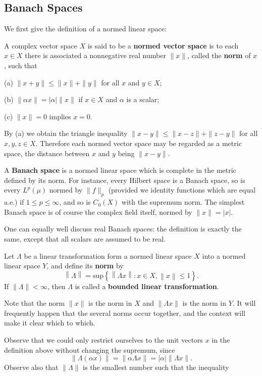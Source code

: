 \subsection{Banach Spaces}
We first give the definition of a normed linear space: 
\begin{definition}
A complex vector space $X$ is said to be a \textbf{normed vector space} is to each $x\in X$ there is associated a nonnegative real number $\|x\|$, called the \textbf{norm} of $x$, such that \par
(a) $\|x+y\|\le\|x\|+\|y\|$ for all $x$ and $y\in X$;\par
(b) $\|\alpha x\|=|\alpha|\|x\|$ if $x\in X$ and $\alpha$ is a scalar;\par
(c) $\|x\|=0$ implies $x=0$.
\end{definition}
By (a) we obtain the triangle inequality $\|x-y\|\le\|x-z\|+\|z-y\|$ for all $x,y,z\in X$. Therefore each normed vector space may be regarded as a metric space, the distance between $x$ and $y$ being $\|x-y\|$.\par
A \textbf{Banach space} is a normed linear space which is complete in the metric defined by its norm. For instance, every Hilbert space is a Banach space, so is every $L^p(\mu)$ normed by $\|f\|_p$ (provided we identity functions which are equal a.e.) if $1\le p\le\infty$, and so is $C_0(X)$ with the supremum norm. The simplest Banach space is of course the complex field itself, normed by $\|x\|=|x|$.\par
One can equally well discuss real Banach spaces: the definition is exactly the same, except that all scalars are assumed to be real.
\begin{definition}
Let $\Lambda$ be a linear transformation form a normed linear space $X$ into a normed linear space $Y$, and define its \textbf{norm} by 
$$
\left\| \Lambda \right\| =\mathrm{sup}\left\{ \left\| \Lambda x \right\| :x\in X,\left\| x \right\| \le 1 \right\} .
$$
If $\|\Lambda\|<\infty$, then $\Lambda$ is called a \textbf{bounded linear transformation}.
\end{definition}
Note that the norm $\|x\|$ is the norm in $X$ and $\|\Lambda x\|$ is the norm in $Y$. It will frequently happen that the several norms occur together, and the context will make it clear which to which.\par
Observe that we could only restrict ourselves to the unit vectors $x$ in the definition above without changing the supremum, since 
$$\|\Lambda(\alpha x)\|=\|\alpha\Lambda x\|=|\alpha|\|\Lambda x\|.$$
Observe also that $\|\Lambda\|$ is the smallest number such that the inequality 
